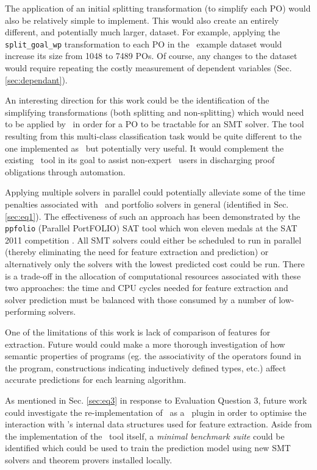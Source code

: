 The application of an initial splitting transformation (to simplify each PO) would also be relatively simple to implement.
This would also create an entirely different, and potentially much larger, dataset. 
For example, applying the \texttt{split\_goal\_wp} transformation to each PO in the \why~example dataset would increase its size from 1048 to 7489 POs.
Of course, any changes to the dataset would require repeating the costly measurement of dependent variables (Sec. \ref{sec:dependant}).

An interesting direction for this work could be the identification of the simplifying transformations (both splitting and non-splitting) which would need to be applied by \why~in order for a PO to be tractable for an SMT solver.
The tool resulting from this multi-class classification task would be quite different to the one implemented as \where~but potentially very useful.
It would complement the existing \where~tool in its goal to assist non-expert \why~users in discharging proof obligations through automation.

Applying multiple solvers in parallel could potentially alleviate some of the time penalties associated with \where~and portfolio solvers in general (identified in Sec. \ref{sec:eq1}).
The effectiveness of such an approach has been demonstrated by the \texttt{ppfolio} (Parallel PortFOLIO) SAT tool which won eleven medals at the SAT 2011 competition \cite{Malitsky2012}.
All SMT solvers could either be scheduled to run in parallel (thereby eliminating the need for feature extraction and prediction) or alternatively only the solvers with the lowest predicted cost could be run.
There is a trade-off in the allocation of computational resources associated with these two approaches: the time and CPU cycles needed for feature extraction and solver prediction must be balanced with those consumed by a number of low-performing solvers.     

One of the limitations of this work is lack of comparison of features for extraction. 
Future would could make a more thorough investigation of how semantic properties of programs (eg. the associativity of the operators found in the program, constructions indicating inductively defined types, etc.) affect accurate predictions for each learning algorithm. 
 
As mentioned in Sec. \ref{sec:eq3} in response to Evaluation Question 3, future work could investigate the re-implementation of \where~as a \why~plugin in order to optimise the interaction with \why's internal data structures used for feature extraction.
Aside from the implementation of the \where~tool itself, a
\textit{minimal benchmark suite} could be identified which could be used to train the prediction model using new SMT solvers and theorem provers installed locally.
